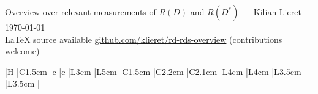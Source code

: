 


    \thispagestyle{empty}
    \begin{center}\Large
        Overview over relevant measurements of $R(D)$ and $R(D^*)$
        --- Kilian Lieret
        --- \today \\
        \large
        \LaTeX{} source available \url{github.com/klieret/rd-rds-overview} (contributions welcome)
    \end{center}
    
    \begin{center}
        \begin{tabular}{
                |H %
                |C{1.5cm} %
                |c %
                |c %
                |L{3cm} %
                |L{5cm} %
                |C{1.5cm} %
                |C{2.2cm} %
                |C{2.1cm} %
                |L{4cm} %
                |L{4cm} %
                |L{3.5cm} %
                |L{3.5cm} %
                |
                }
            \hline
            
            \\\hline
        \end{tabular}
    \end{center}
    
